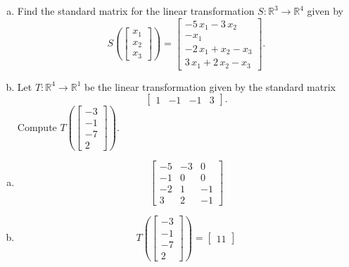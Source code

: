 
\begin{exerciseStatement}

\begin{enumerate}[(a)]
\item Find the standard matrix for the linear transformation \(S:\mathbb{R}^ 3  \to \mathbb{R}^ 4 \) given by \[S\left(  \left[\begin{array}{c}
x_{1} \\
x_{2} \\
x_{3}
\end{array}\right]  \right) =  \left[\begin{array}{c}
-5 \, x_{1} - 3 \, x_{2} \\
-x_{1} \\
-2 \, x_{1} + x_{2} - x_{3} \\
3 \, x_{1} + 2 \, x_{2} - x_{3}
\end{array}\right] .\]
\item Let \(T:\mathbb{R}^ 4  \to \mathbb{R}^ 1 \) be the linear transformation given by the standard matrix \[ \left[\begin{array}{cccc}
1 & -1 & -1 & 3
\end{array}\right] .\] Compute \(T\left( \left[\begin{array}{c}
-3 \\
-1 \\
-7 \\
2
\end{array}\right]  \right)\). 
\end{enumerate}
    
\end{exerciseStatement}
    
\begin{exerciseAnswer} 

\begin{enumerate}[(a)]
\item \[ \left[\begin{array}{ccc}
-5 & -3 & 0 \\
-1 & 0 & 0 \\
-2 & 1 & -1 \\
3 & 2 & -1
\end{array}\right] \]
\item \[T\left( \left[\begin{array}{c}
-3 \\
-1 \\
-7 \\
2
\end{array}\right]  \right)= \left[\begin{array}{c}
11
\end{array}\right] \]
\end{enumerate}
    
\end{exerciseAnswer}
    
